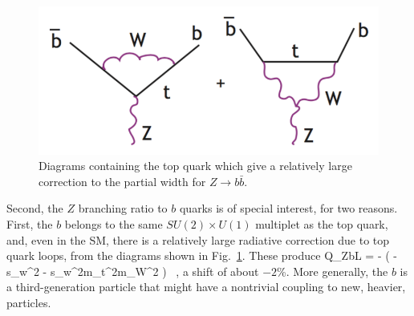 \documentclass[12pt]{article}
\begin{document}
\begin{figure}
\begin{center}
\includegraphics[width=0.40\hsize]{Ztoploops.pdf}
\end{center}
\caption{Diagrams containing the top quark which give a relatively
  large
correction to the partial width for $Z\to b\bar b$.}
\label{fig:Ztoploops}
\end{figure}



Second, the $Z$ branching ratio to  $b$ quarks is of special interest,
for two reasons.  First, the $b$ belongs to the same $SU(2)\times
U(1)$ multiplet as the top quark, and, even in the SM, there is a
relatively large radiative correction due to top quark loops, from the
diagrams shown in Fig.~\ref{fig:Ztoploops}.   These produce 
\beq
    Q_{ZbL} = - \biggl( \half - \third s_w^2 - {\alpha{}\pi
    s_w^2}{m_t^2\over m_W^2} \biggr) \ , 
a shift of about $-2$\%.  More generally,  the $b$ is a
third-generation particle that might have a nontrivial coupling to
new, heavier, particles.
\end{document}

